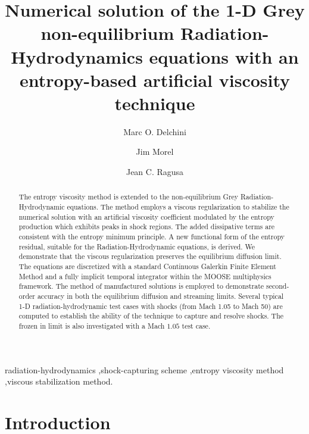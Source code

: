 \documentclass[review]{elsarticle}
\begin{document}
%
\begin{frontmatter}
%
\title{Numerical solution of the 1-D Grey non-equilibrium Radiation-Hydrodynamics equations with an entropy-based artificial viscosity technique}
\author{Marc O. Delchini}

\author{Jim Morel}

\author{Jean C. Ragusa}

\address[label1]{Department of Nuclear Engineering, Texas A\&M University, College Station, TX 77843, USA }

\begin{abstract}
The entropy viscosity method is extended to the non-equilibrium Grey Radiation-Hydrodynamic equations. 
The method employs a viscous regularization to stabilize the numerical solution with an artificial viscosity coefficient modulated by the entropy production which exhibits peaks in shock regions. The added dissipative terms are consistent with the entropy minimum principle.  A new functional form of the entropy residual, suitable for the Radiation-Hydrodynamic equations, is derived. We demonstrate that the viscous regularization preserves the equilibrium diffusion limit. The equations are discretized with a standard Continuous Galerkin Finite Element Method and a fully implicit temporal integrator within the MOOSE multiphysics framework. The method of manufactured solutions is employed to demonstrate second-order accuracy in both the equilibrium diffusion and streaming limits. Several typical 1-D radiation-hydrodynamic test cases with shocks (from Mach 1.05 to Mach 50) are computed to establish the ability of the technique to capture and resolve shocks. The frozen in limit is also investigated with a Mach $1.05$ test case.
\end{abstract}
%
\begin{keyword}
radiation-hydrodynamics \sep shock-capturing scheme \sep entropy viscosity method \sep viscous stabilization method.
\end{keyword}
%
\end{frontmatter}
%
\linenumbers
%
\section{Introduction}
\label{sec:section1}
\end{document}
